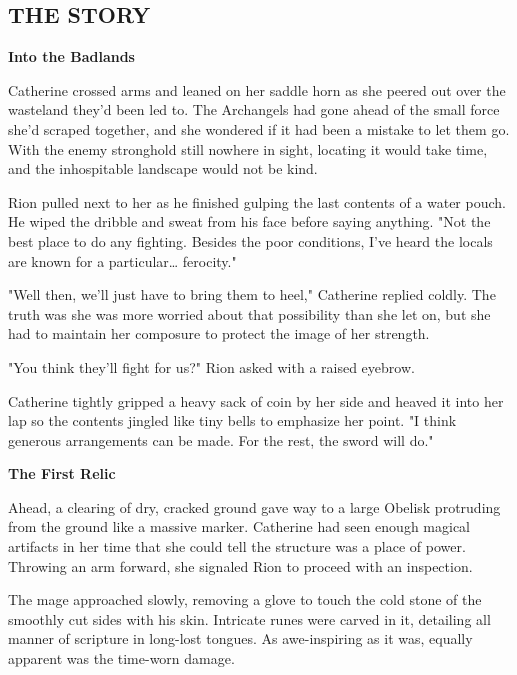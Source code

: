
\newpage

\begin{multicols*}{2}

\subsection*{\MakeUppercase{The story}}

\textbf{Into the Badlands}

Catherine crossed arms and leaned on her saddle horn as she peered out over the wasteland they'd been led to. The Archangels had gone ahead of the small force she'd scraped together, and she wondered if it had been a mistake to let them go. With the enemy stronghold still nowhere in sight, locating it would take time, and the inhospitable landscape would not be kind.

Rion pulled next to her as he finished gulping the last contents of a water pouch. He wiped the dribble and sweat from his face before saying anything. "Not the best place to do any fighting. Besides the poor conditions, I've heard the locals are known for a particular… ferocity."

"Well then, we'll just have to bring them to heel," Catherine replied coldly. The truth was she was more worried about that possibility than she let on, but she had to maintain her composure to protect the image of her strength.

"You think they'll fight for us?" Rion asked with a raised eyebrow.

Catherine tightly gripped a heavy sack of coin by her side and heaved it into her lap so the contents jingled like tiny bells to emphasize her point. "I think generous arrangements can be made. For the rest, the sword will do."



\textbf{The First Relic}

Ahead, a clearing of dry, cracked ground gave way to a large Obelisk protruding from the ground like a massive marker. Catherine had seen enough magical artifacts in her time that she could tell the structure was a place of power. Throwing an arm forward, she signaled Rion to proceed with an inspection.

The mage approached slowly, removing a glove to touch the cold stone of the smoothly cut sides with his skin. Intricate runes were carved in it, detailing all manner of scripture in long-lost tongues. As awe-inspiring as it was, equally apparent was the time-worn damage.


\end{multicols*}
